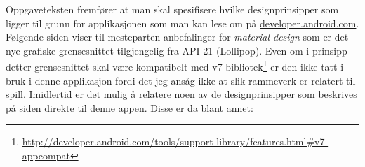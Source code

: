 Oppgaveteksten fremfører at man skal spesifisere hvilke designprinsipper som ligger til grunn for applikasjonen som man kan lese om på \href{http://developer.android.com/design/index.html}{developer.android.com}.
Følgende siden viser til mesteparten anbefalinger for \textit{material design} som er det nye grafiske grensesnittet tilgjengelig fra API 21 (Lollipop). Even om i prinsipp detter grensesnittet skal være kompatibelt med v7 bibliotek\footnote{\href{http://developer.android.com/tools/support-library/features.html\#v7-appcompat}{http://developer.android.com/tools/support-library/features.html\#v7-appcompat}} 
er den ikke tatt i bruk i denne applikasjon fordi det jeg ansåg ikke at slik rammeverk er relatert til spill.
Imidlertid er det mulig å relatere noen av de designprinsipper som beskrives på siden direkte til denne appen. Disse er da blant annet: 

